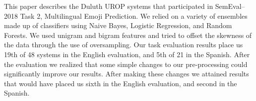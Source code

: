 This paper describes the Duluth UROP systems that participated in SemEval--2018 Task 2, Multilingual Emoji Prediction. We relied on a variety of ensembles made up of classifiers using Naive Bayes, Logistic Regression, and Random Forests. We used unigram and bigram features and tried to offset the skewness of the data through the use of oversampling. Our task evaluation results place us 19th of 48 systems in the English evaluation, and 5th of 21 in the Spanish. After the evaluation we realized that some simple changes to our pre-processing could significantly improve our results. After making these changes we attained results that would have placed us sixth in the English evaluation, and second in the Spanish.
